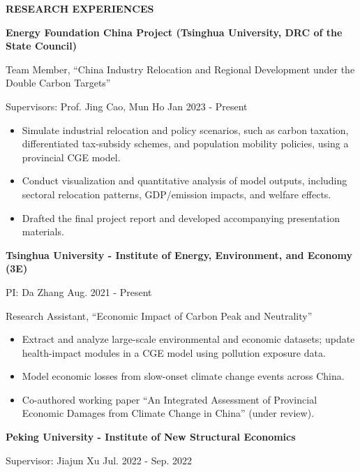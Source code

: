\documentclass[UTF8]{ctexbook}
\begin{document}
\vspace{12pt}

\begin{center}
    \textbf{RESEARCH EXPERIENCES}
\end{center}

\textbf{Energy Foundation China Project (Tsinghua University, DRC of the State Council)}

\quad Team Member, ``China Industry Relocation and Regional Development under the Double Carbon Targets''

\quad Supervisors: Prof. Jing Cao, Mun Ho \hfill Jan 2023 - Present

\begin{itemize}[leftmargin=1.5em, itemsep=2pt, topsep=4pt]
    \item Simulate industrial relocation and policy scenarios, such as carbon taxation, differentiated tax-subsidy schemes, and population mobility policies, using a provincial CGE model.
    \item Conduct visualization and quantitative analysis of model outputs, including sectoral relocation patterns, GDP/emission impacts, and welfare effects.
    \item Drafted the final project report and developed accompanying presentation materials.
\end{itemize}

\textbf{Tsinghua University - Institute of Energy, Environment, and Economy (3E)}

\quad PI: Da Zhang \hfill Aug. 2021 - Present

\quad Research Assistant, ``Economic Impact of Carbon Peak and Neutrality''

\begin{itemize}[leftmargin=1.5em, itemsep=2pt, topsep=4pt]
    \item Extract and analyze large-scale environmental and economic datasets; update health-impact modules in a CGE model using pollution exposure data.
    \item Model economic losses from slow-onset climate change events across China.
    \item Co-authored working paper ``An Integrated Assessment of Provincial Economic Damages from Climate Change in China'' (under review).
\end{itemize}

\textbf{Peking University - Institute of New Structural Economics}

\quad Supervisor: Jiajun Xu \hfill Jul. 2022 - Sep. 2022
\end{document}
